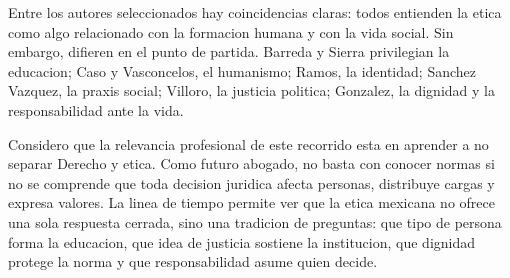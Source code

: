 \documentclass[
	spanish,
	letterpaper, oneside
]{article}
\begin{document}
Entre los autores seleccionados hay coincidencias claras: todos entienden la etica como algo relacionado con la formacion humana y con la vida social. Sin embargo, difieren en el punto de partida. Barreda y Sierra privilegian la educacion; Caso y Vasconcelos, el humanismo; Ramos, la identidad; Sanchez Vazquez, la praxis social; Villoro, la justicia politica; Gonzalez, la dignidad y la responsabilidad ante la vida.

Considero que la relevancia profesional de este recorrido esta en aprender a no separar Derecho y etica. Como futuro abogado, no basta con conocer normas si no se comprende que toda decision juridica afecta personas, distribuye cargas y expresa valores. La linea de tiempo permite ver que la etica mexicana no ofrece una sola respuesta cerrada, sino una tradicion de preguntas: que tipo de persona forma la educacion, que idea de justicia sostiene la institucion, que dignidad protege la norma y que responsabilidad asume quien decide.


\end{document}
